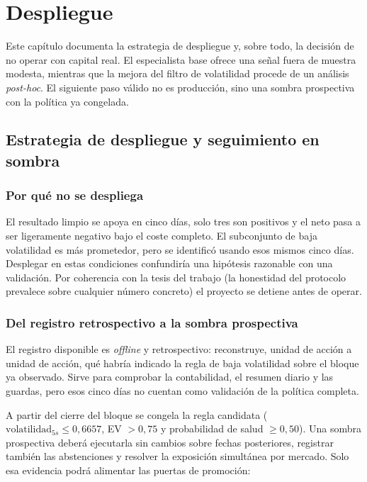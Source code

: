 %
\chapter{Despliegue}
\label{ch::despliegue}

Este capítulo documenta la estrategia de despliegue y, sobre todo, la decisión de no operar
con capital real. El especialista base ofrece una señal fuera de muestra modesta, mientras
que la mejora del filtro de volatilidad procede de un análisis \emph{post-hoc}. El siguiente
paso válido no es producción, sino una sombra prospectiva con la política ya congelada.

\section{Estrategia de despliegue y seguimiento en sombra}

\subsection{Por qué no se despliega}

El resultado limpio se apoya en cinco días, solo tres son positivos y el neto pasa a ser
ligeramente negativo bajo el coste completo. El subconjunto de baja volatilidad es más
prometedor, pero se identificó usando esos mismos cinco días. Desplegar en estas condiciones
confundiría una hipótesis razonable con una validación. Por coherencia con la tesis del
trabajo (la honestidad del protocolo prevalece sobre cualquier número concreto) el
proyecto se detiene antes de operar.

\subsection{Del registro retrospectivo a la sombra prospectiva}

El registro disponible es \emph{offline} y retrospectivo: reconstruye, unidad de acción a
unidad de acción, qué habría indicado la regla de baja volatilidad sobre el bloque ya
observado. Sirve para comprobar la contabilidad, el resumen diario y las guardas, pero esos
cinco días no cuentan como validación de la política completa.

A partir del cierre del bloque se congela la regla candidata
($\text{volatilidad}_{5s}\leq0{,}6657$, EV $>0{,}75$ y probabilidad de salud
$\geq0{,}50$). Una sombra prospectiva deberá ejecutarla sin cambios sobre fechas posteriores,
registrar también las abstenciones y resolver la exposición simultánea por mercado. Solo esa
evidencia podrá alimentar las puertas de promoción:

